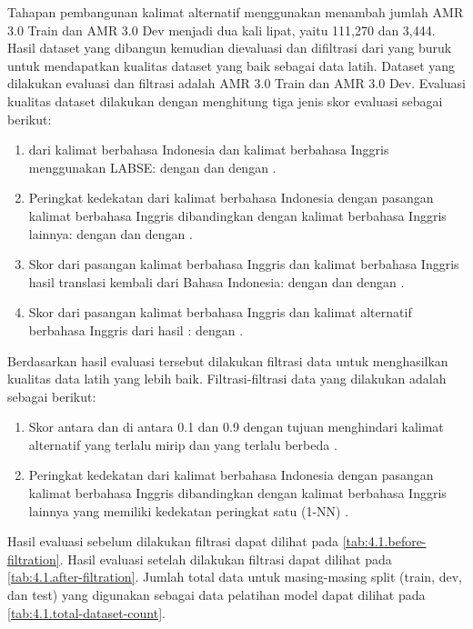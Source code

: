 Tahapan pembangunan kalimat alternatif menggunakan \AMRtoTEXT{} menambah jumlah AMR 3.0 Train dan AMR 3.0 Dev menjadi dua kali lipat, yaitu 111,270 dan 3,444.
Hasil dataset yang dibangun kemudian dievaluasi dan difiltrasi dari yang buruk untuk mendapatkan kualitas dataset yang baik sebagai data latih.
Dataset yang dilakukan evaluasi dan filtrasi adalah AMR 3.0 Train dan AMR 3.0 Dev.
Evaluasi kualitas dataset dilakukan dengan menghitung tiga jenis skor evaluasi sebagai berikut:

\begin{enumerate}
  \item \Cossim{} dari  kalimat berbahasa Indonesia dan kalimat berbahasa Inggris menggunakan \gls{LABSE}:  dengan  dan  dengan .
  \item Peringkat  kedekatan  dari kalimat berbahasa Indonesia dengan pasangan kalimat berbahasa Inggris dibandingkan dengan kalimat berbahasa Inggris lainnya:  dengan  dan  dengan .
  \item Skor \BLEU{} dari pasangan kalimat berbahasa Inggris dan kalimat berbahasa Inggris hasil translasi kembali dari Bahasa Indonesia:  dengan  dan  dengan .
  \item Skor \BLEU{} dari pasangan kalimat berbahasa Inggris dan kalimat alternatif berbahasa Inggris dari hasil \AMRtoTEXT{}:  dengan .
\end{enumerate}

Berdasarkan hasil evaluasi tersebut dilakukan filtrasi data untuk menghasilkan kualitas data latih yang lebih baik.
Filtrasi-filtrasi data yang dilakukan adalah sebagai berikut:

\begin{enumerate}
  \item Skor \BLEU{} antara  dan  di antara 0.1 dan 0.9 dengan tujuan menghindari kalimat alternatif yang terlalu mirip dan yang terlalu berbeda .
  \item Peringkat  kedekatan  dari kalimat berbahasa Indonesia dengan pasangan kalimat berbahasa Inggris dibandingkan dengan kalimat berbahasa Inggris lainnya yang memiliki kedekatan peringkat satu (\gls{1-NN}) .
\end{enumerate}

Hasil evaluasi sebelum dilakukan filtrasi dapat dilihat pada \cref{tab:4.1.before-filtration}.
Hasil evaluasi setelah dilakukan filtrasi dapat dilihat pada \cref{tab:4.1.after-filtration}.
Jumlah total data untuk masing-masing split (train, dev, dan test) yang digunakan sebagai data pelatihan model dapat dilihat pada \cref{tab:4.1.total-dataset-count}.

